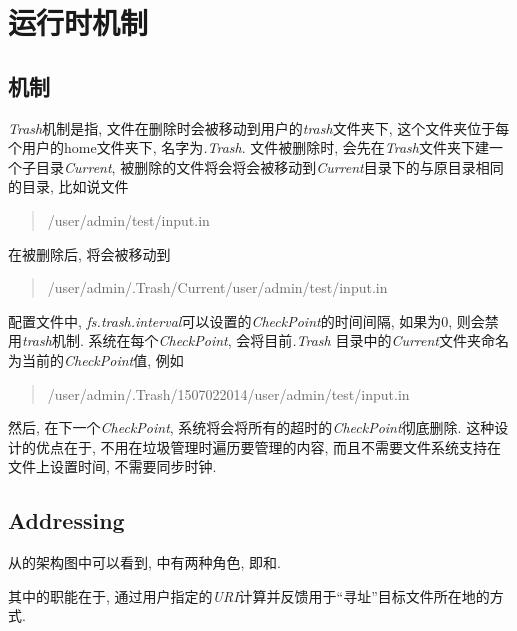\section{运行时机制}
\label{sec:hfs:rtm}

\subsection{{\Trash}机制}
\label{ssec:hfs:trashing}

\def\Trash{\emph{Trash}}
\def\trash{\emph{trash}}
{\Trash}机制是指, 文件在删除时会被移动到用户的{\trash}文件夹下,
这个文件夹位于每个用户的home文件夹下, 名字为\emph{.Trash}.
文件被删除时, 会先在{\Trash}文件夹下建一个子目录\emph{Current},
被删除的文件将会将会被移动到\emph{Current}目录下的与原目录相同的目录,
比如说文件
\begin{quote}
    /user/admin/test/input.in
\end{quote}
在被删除后, 将会被移动到
\begin{quote}
    /user/admin/.Trash/Current/user/admin/test/input.in
\end{quote}
配置文件中, \emph{fs.trash.interval}可以设置的\emph{CheckPoint}的时间间隔,
如果为0, 则会禁用{\trash}机制. 系统在每个\emph{CheckPoint}, 会将目前\emph{.Trash}
目录中的\emph{Current}文件夹命名为当前的\emph{CheckPoint}值, 例如
\begin{quote}
    /user/admin/.Trash/1507022014/user/admin/test/input.in
\end{quote}
然后, 在下一个\emph{CheckPoint}, 系统将会将所有的超时的\emph{CheckPoint}彻底删除.
这种设计的优点在于, 不用在垃圾管理时遍历要管理的内容,
而且不需要文件系统支持在文件上设置时间, 不需要同步时钟.

\subsection{Addressing}
\label{ssec:hfs:addressing}


从{\HDFS}的架构图中可以看到, {\HDFS}中有两种角色, 即{\NameN}和{\DataN}.

其中{\DataN}的职能在于, 通过用户指定的\emph{URI}计算并反馈用于``寻址''目标文件所在地的方式.
